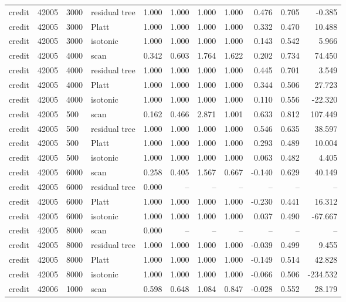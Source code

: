 \begin{tabular}{lrllrrrrrrr}
credit & 42005 & 3000 & residual tree & 1.000 & 1.000 & 1.000 & 1.000 & 0.476 & 0.705 & -0.385 \\
credit & 42005 & 3000 & Platt & 1.000 & 1.000 & 1.000 & 1.000 & 0.332 & 0.470 & 10.488 \\
credit & 42005 & 3000 & isotonic & 1.000 & 1.000 & 1.000 & 1.000 & 0.143 & 0.542 & 5.966 \\
credit & 42005 & 4000 & scan & 0.342 & 0.603 & 1.764 & 1.622 & 0.202 & 0.734 & 74.450 \\
credit & 42005 & 4000 & residual tree & 1.000 & 1.000 & 1.000 & 1.000 & 0.445 & 0.701 & 3.549 \\
credit & 42005 & 4000 & Platt & 1.000 & 1.000 & 1.000 & 1.000 & 0.344 & 0.506 & 27.723 \\
credit & 42005 & 4000 & isotonic & 1.000 & 1.000 & 1.000 & 1.000 & 0.110 & 0.556 & -22.320 \\
credit & 42005 & 500 & scan & 0.162 & 0.466 & 2.871 & 1.001 & 0.633 & 0.812 & 107.449 \\
credit & 42005 & 500 & residual tree & 1.000 & 1.000 & 1.000 & 1.000 & 0.546 & 0.635 & 38.597 \\
credit & 42005 & 500 & Platt & 1.000 & 1.000 & 1.000 & 1.000 & 0.293 & 0.489 & 10.004 \\
credit & 42005 & 500 & isotonic & 1.000 & 1.000 & 1.000 & 1.000 & 0.063 & 0.482 & 4.405 \\
credit & 42005 & 6000 & scan & 0.258 & 0.405 & 1.567 & 0.667 & -0.140 & 0.629 & 40.149 \\
credit & 42005 & 6000 & residual tree & 0.000 & -- & -- & -- & -- & -- & -- \\
credit & 42005 & 6000 & Platt & 1.000 & 1.000 & 1.000 & 1.000 & -0.230 & 0.441 & 16.312 \\
credit & 42005 & 6000 & isotonic & 1.000 & 1.000 & 1.000 & 1.000 & 0.037 & 0.490 & -67.667 \\
credit & 42005 & 8000 & scan & 0.000 & -- & -- & -- & -- & -- & -- \\
credit & 42005 & 8000 & residual tree & 1.000 & 1.000 & 1.000 & 1.000 & -0.039 & 0.499 & 9.455 \\
credit & 42005 & 8000 & Platt & 1.000 & 1.000 & 1.000 & 1.000 & -0.149 & 0.514 & 42.828 \\
credit & 42005 & 8000 & isotonic & 1.000 & 1.000 & 1.000 & 1.000 & -0.066 & 0.506 & -234.532 \\
credit & 42006 & 1000 & scan & 0.598 & 0.648 & 1.084 & 0.847 & -0.028 & 0.552 & 28.179 \\

\end{tabular}
